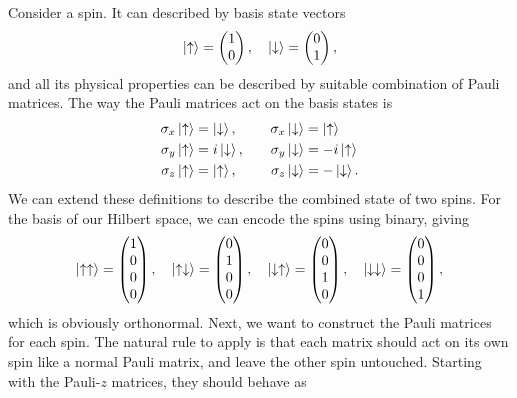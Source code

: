 \documentclass{article}
\begin{document}
Consider a spin. It can described by basis state vectors
\[
    \ket{\uparrow} =\begin{pmatrix}
        1 \\ 0
    \end{pmatrix},\quad \ket{\downarrow} =\begin{pmatrix}
    0 \\ 1
    \end{pmatrix},
\]
and all its physical properties can be described by suitable combination of Pauli matrices. The way the Pauli matrices act on the basis states is
\begin{align*}
    \sigma _x \ket{\uparrow} &= \ket{\downarrow},&\quad \sigma _x \ket{\downarrow}&= \ket{\uparrow} \\
    \sigma _y \ket{\uparrow} &= i \ket{\downarrow},&\quad \sigma _y \ket{\downarrow}&=-i \ket{\uparrow} \\
    \sigma _z \ket{\uparrow} &= \ket{ \uparrow},&\quad \sigma _z \ket{\downarrow}&=-\ket{\downarrow}.
\end{align*}
We can extend these definitions to describe the combined state of two spins. For the basis of our Hilbert space, we can encode the spins using binary, giving
\[
    \ket{\uparrow \uparrow}=\begin{pmatrix}
        1 \\ 0\\0\\0
    \end{pmatrix},\quad \ket{\uparrow \downarrow}=\begin{pmatrix}
        0 \\ 1 \\ 0 \\ 0
    \end{pmatrix},\quad \ket{\downarrow \uparrow} =\begin{pmatrix}
        0\\0\\1\\0
    \end{pmatrix},\quad \ket{\downarrow \downarrow}=\begin{pmatrix}
        0\\0\\0\\1
    \end{pmatrix},
\]
which is obviously orthonormal. Next, we want to construct the Pauli matrices for each spin. The natural rule to apply is that each matrix should act on its own spin like a normal Pauli matrix, and leave the other spin untouched. Starting with the Pauli-$z$ matrices, they should behave as
\end{document}
